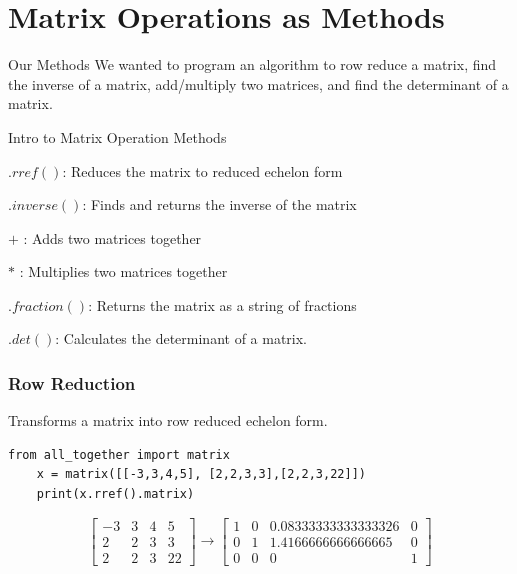 \documentclass{beamer}
\begin{document}
\section{Matrix Operations as Methods}
\begin{frame}{Our Methods}
We wanted to program an algorithm to row reduce a matrix, find the inverse of a matrix, add/multiply two matrices, and find the determinant of a matrix.
\end{frame}
\begin{frame}{Intro to Matrix Operation Methods}
    \begin{center}
        $.rref()$: Reduces the matrix to reduced echelon form
        
        $.inverse()$: Finds and returns the inverse of the matrix

        $+$ : Adds two matrices together

        $*$ : Multiplies two matrices together

        $.fraction()$: Returns the matrix as a string of fractions

        \(.det()\): Calculates the determinant of a matrix. 
    \end{center}
\end{frame}

\begin{frame}[fragile=singleslide]\frametitle{Row Reduction}
Transforms a matrix into row reduced echelon form.
\begin{verbatim}
from all_together import matrix
    x = matrix([[-3,3,4,5], [2,2,3,3],[2,2,3,22]])
    print(x.rref().matrix) 
\end{verbatim}
\begin{equation*}
\left[
\begin{array}{cccc}
    -3 & 3 & 4 &5   \\
     2&2&3&3 \\
     2&2&3&22
\end{array}
\right]
\rightarrow
\left[
\begin{array}{cccc}
    1 & 0 & 0.08333333333333326 &0   \\
     0&1& 1.4166666666666665&0 \\
     0&0&0&1
\end{array}
\right]
\end{equation*}
\end{frame}
\end{document}
